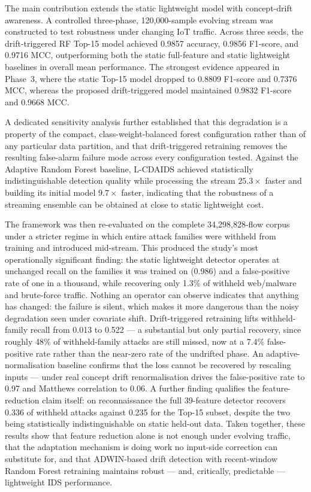 \documentclass[11pt,a4paper]{article}
\begin{document}
The main contribution extends the static lightweight model with
concept-drift awareness. A controlled three-phase, 120{,}000-sample
evolving stream was constructed to test robustness under changing IoT
traffic. Across three seeds, the drift-triggered RF Top-15 model
achieved 0.9857 accuracy, 0.9856 F1-score, and 0.9716 MCC,
outperforming both the static full-feature and static lightweight
baselines in overall mean performance. The strongest evidence appeared
in Phase~3, where the static Top-15 model dropped to 0.8809 F1-score and
0.7376 MCC, whereas the proposed drift-triggered model maintained 0.9832
F1-score and 0.9668 MCC.

A dedicated sensitivity analysis further established that this
degradation is a property of the compact, class-weight-balanced forest
configuration rather than of any particular data partition, and that
drift-triggered retraining removes the resulting false-alarm failure
mode across every configuration tested. Against the Adaptive Random
Forest baseline, L-CDAIDS achieved statistically indistinguishable
detection quality while processing the stream $25.3\times$ faster and
building its initial model $9.7\times$ faster, indicating that the
robustness of a streaming ensemble can be obtained at close to static
lightweight cost.

The framework was then re-evaluated on the complete 34{,}298{,}828-flow corpus
under a stricter regime in which entire attack families were withheld from
training and introduced mid-stream. This produced the study's most
operationally significant finding: the static lightweight detector operates at
unchanged recall on the families it was trained on (0.986) and a false-positive
rate of one in a thousand, while recovering only 1.3\% of withheld web/malware
and brute-force traffic. Nothing an operator can observe indicates that anything
has changed: the failure is silent, which makes it more dangerous than the
noisy degradation seen under covariate shift. Drift-triggered retraining lifts
withheld-family recall from 0.013 to 0.522 --- a substantial but only partial
recovery, since roughly 48\% of withheld-family attacks are still missed, now
at a 7.4\% false-positive rate rather than the near-zero rate of the undrifted
phase. An adaptive-normalisation baseline confirms that the loss cannot be
recovered by rescaling inputs ---
under real concept drift renormalisation drives the false-positive rate to 0.97
and Matthews correlation to 0.06. A further finding qualifies the
feature-reduction claim itself: on reconnaissance the full 39-feature detector
recovers 0.336 of withheld attacks against 0.235 for the Top-15 subset, despite
the two being statistically indistinguishable on static held-out data. Taken
together, these results show that feature reduction alone is not enough under
evolving traffic, that the adaptation mechanism is doing work no input-side
correction can substitute for, and that ADWIN-based drift detection with
recent-window Random Forest retraining maintains robust --- and, critically,
predictable --- lightweight IDS performance.
\end{document}
